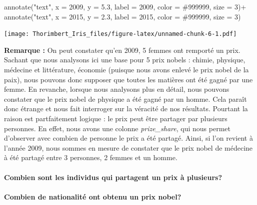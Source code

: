 \documentclass[
]{article}
\newenvironment{Shaded}{\begin{snugshade}}{\end{snugshade}}
\newcommand{\AttributeTok}[1]{\textcolor[rgb]{0.77,0.63,0.00}{#1}}
\newcommand{\DecValTok}[1]{\textcolor[rgb]{0.00,0.00,0.81}{#1}}
\newcommand{\FloatTok}[1]{\textcolor[rgb]{0.00,0.00,0.81}{#1}}
\newcommand{\FunctionTok}[1]{\textcolor[rgb]{0.00,0.00,0.00}{#1}}
\newcommand{\NormalTok}[1]{#1}
\newcommand{\SpecialCharTok}[1]{\textcolor[rgb]{0.00,0.00,0.00}{#1}}
\newcommand{\StringTok}[1]{\textcolor[rgb]{0.31,0.60,0.02}{#1}}
\begin{document}
\begin{Shaded}
\begin{Highlighting}[]
  \FunctionTok{annotate}\NormalTok{(}\StringTok{"text"}\NormalTok{, }\AttributeTok{x =} \DecValTok{2009}\NormalTok{, }\AttributeTok{y =} \FloatTok{5.3}\NormalTok{, }\AttributeTok{label =} \DecValTok{2009}\NormalTok{, }\AttributeTok{color =} \StringTok{\textquotesingle{}\#999999\textquotesingle{}}\NormalTok{, }\AttributeTok{size =} \DecValTok{3}\NormalTok{)}\SpecialCharTok{+}
  \FunctionTok{annotate}\NormalTok{(}\StringTok{"text"}\NormalTok{, }\AttributeTok{x =} \DecValTok{2015}\NormalTok{, }\AttributeTok{y =} \FloatTok{2.3}\NormalTok{, }\AttributeTok{label =} \DecValTok{2015}\NormalTok{, }\AttributeTok{color =} \StringTok{\textquotesingle{}\#999999\textquotesingle{}}\NormalTok{, }\AttributeTok{size =} \DecValTok{3}\NormalTok{)}
\end{Highlighting}
\end{Shaded}

\texttt{[image: Thorimbert\_Iris\_files/figure-latex/unnamed-chunk-6-1.pdf]}

\textbf{Remarque :} On peut constater qu'en 2009, 5 femmes ont remporté
un prix. Sachant que nous analysons ici une base pour 5 prix nobels :
chimie, physique, médecine et littérature, économie (puisque nous avons
enlevé le prix nobel de la paix), nous pouvons donc supposer que toutes
les matières ont été gagné par une femme. En revanche, lorsque nous
analysons plus en détail, nous pouvons constater que le prix nobel de
physique a été gagné par un homme. Cela paraît donc étrange et nous fait
interroger sur la véracité de nos résultats. Pourtant la raison est
partfaitement logique : le prix peut être partager par plusieurs
personnes. En effet, nous avons une colonne \emph{prize\_share}, qui
nous permet d'observer avec combien de personne le prix a été partagé.
Ainsi, si l'on revient à l'année 2009, nous sommes en mesure de
constater que le prix nobel de médecine à été partagé entre 3 personnes,
2 femmes et un homme.

\hypertarget{combien-sont-les-individus-qui-partagent-un-prix-uxe0-plusieurs}{%
\paragraph{\texorpdfstring{\textbf{Combien sont les individus qui
partagent un prix à
plusieurs?}}{Combien sont les individus qui partagent un prix à plusieurs?}}\label{combien-sont-les-individus-qui-partagent-un-prix-uxe0-plusieurs}}

\hypertarget{combien-de-nationalituxe9-ont-obtenu-un-prix-nobel}{%
\paragraph{\texorpdfstring{\textbf{Combien de nationalité ont obtenu un
prix
nobel?}}{Combien de nationalité ont obtenu un prix nobel?}}\label{combien-de-nationalituxe9-ont-obtenu-un-prix-nobel}}
\end{document}
